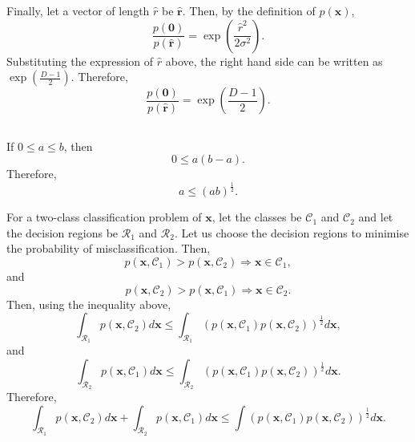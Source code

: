 Finally, let a vector of length $\hat{r}$ be $\hat{\mathbf{r}}$.
Then, by the definition of $p(\mathbf{x})$,
%
\begin{equation}
\frac
{p(\mathbf{0})}
{p 
\left( 
	\hat{\mathbf{r}} 
\right)} 
= 
\exp 
\left( 
	\frac{\hat{r} ^ 2}{2 \sigma ^2} 
\right).
\end{equation}
%
Substituting the expression of $\hat{r}$ above, the right hand side can be written as $\exp \left( \frac{D - 1}{2} \right)$.
Therefore,
%
\begin{equation}
\frac
{p(\mathbf{0})}
{p 
\left( 
	\hat{\mathbf{r}} 
\right)} 
= 
\exp 
\left( 
	\frac{D - 1}{2} 
\right).
\end{equation}
%


\subsection{}
\label{1.21}
If $0 \leq a \leq b$, then
%
\begin{equation}
0 
\leq 
a (b - a).
\end{equation}
%
Therefore,
%
\begin{equation}
a 
\leq 
(ab) ^ \frac{1}{2}.
\end{equation}
%

For a two-class classification problem of $\mathbf{x}$, let the classes be $\mathcal{C}_1$ and $\mathcal{C}_2$ and let the decision regions be $\mathcal{R}_1$ and $\mathcal{R}_2$.
Let us choose the decision regions to minimise the probability of misclassification.
Then,
%
\begin{equation}
p(\mathbf{x}, \mathcal{C}_1) 
> 
p(\mathbf{x}, \mathcal{C}_2) 
\Rightarrow 
\mathbf{x} \in \mathcal{C}_1, 
\end{equation}
%
and
%
\begin{equation}
p(\mathbf{x}, \mathcal{C}_2) 
> 
p(\mathbf{x}, \mathcal{C}_1) 
\Rightarrow \mathbf{x} 
\in 
\mathcal{C}_2.
\end{equation}
%
Then, using the inequality above,
%
\begin{equation}
\int_{\mathcal{R}_1} 
p(\mathbf{x}, \mathcal{C}_2) 
d\mathbf{x} 
\leq 
\int_{\mathcal{R}_1} 
\left( 
	p(\mathbf{x}, \mathcal{C}_1) 
	p(\mathbf{x}, \mathcal{C}_2) 
\right) ^ \frac{1}{2} 
d\mathbf{x},
\end{equation}
%
and
%
\begin{equation}
\int_{\mathcal{R}_2} 
p(\mathbf{x}, \mathcal{C}_1) 
d\mathbf{x} 
\leq 
\int_{\mathcal{R}_2} 
\left( 
	p(\mathbf{x}, \mathcal{C}_1) 
	p(\mathbf{x}, \mathcal{C}_2) 
\right) ^ \frac{1}{2} 
d\mathbf{x}.
\end{equation}
%
Therefore,
%
\begin{equation}
\int_{\mathcal{R}_1} 
p(\mathbf{x}, \mathcal{C}_2) 
d\mathbf{x} 
+ 
\int_{\mathcal{R}_2} 
p(\mathbf{x}, \mathcal{C}_1) 
d\mathbf{x} 
\leq 
\int 
\left( 
	p(\mathbf{x}, \mathcal{C}_1) 
	p(\mathbf{x}, \mathcal{C}_2) 
\right) ^ \frac{1}{2} 
d\mathbf{x}.
\end{equation}
%


